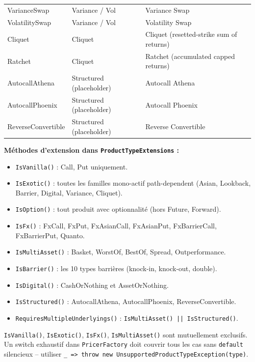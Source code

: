 \documentclass[a4paper,11pt]{article}
\newcommand{\cs}[1]{\texttt{\color{codeinline}#1}}
\begin{document}
\begin{center}
\begin{tabularx}{1.1\textwidth}{>{\ttfamily}l l l}
VarianceSwap & Variance / Vol & Variance Swap \\
VolatilitySwap & Variance / Vol & Volatility Swap \\
Cliquet & Cliquet & Cliquet (resetted-strike sum of returns) \\
Ratchet & Cliquet & Ratchet (accumulated capped returns) \\
AutocallAthena & Structured (placeholder) & Autocall Athena \\
AutocallPhoenix & Structured (placeholder) & Autocall Phoenix \\
ReverseConvertible & Structured (placeholder) & Reverse Convertible \\
\bottomrule
\end{tabularx}
\end{center}

\textbf{M\'ethodes d'extension dans \cs{ProductTypeExtensions} :}

\begin{itemize}[leftmargin=1.5em]
  \item \cs{IsVanilla()} : Call, Put uniquement.
  \item \cs{IsExotic()} : toutes les familles mono-actif path-dependent (Asian, Lookback, Barrier, Digital, Variance, Cliquet).
  \item \cs{IsOption()} : tout produit avec optionnalit\'e (hors Future, Forward).
  \item \cs{IsFx()} : FxCall, FxPut, FxAsianCall, FxAsianPut, FxBarrierCall, FxBarrierPut, Quanto.
  \item \cs{IsMultiAsset()} : Basket, WorstOf, BestOf, Spread, Outperformance.
  \item \cs{IsBarrier()} : les 10 types barri\`eres (knock-in, knock-out, double).
  \item \cs{IsDigital()} : CashOrNothing et AssetOrNothing.
  \item \cs{IsStructured()} : AutocallAthena, AutocallPhoenix, ReverseConvertible.
  \item \cs{RequiresMultipleUnderlyings()} : \cs{IsMultiAsset() || IsStructured()}.
\end{itemize}

\begin{tcolorbox}[constraint]
\cs{IsVanilla()}, \cs{IsExotic()}, \cs{IsFx()}, \cs{IsMultiAsset()} sont mutuellement
exclusifs. Un switch exhaustif dans \cs{PricerFactory} doit couvrir tous les cas
sans \cs{default} silencieux -- utiliser \cs{_ => throw new UnsupportedProductTypeException(type)}.
\end{tcolorbox}
\end{document}
